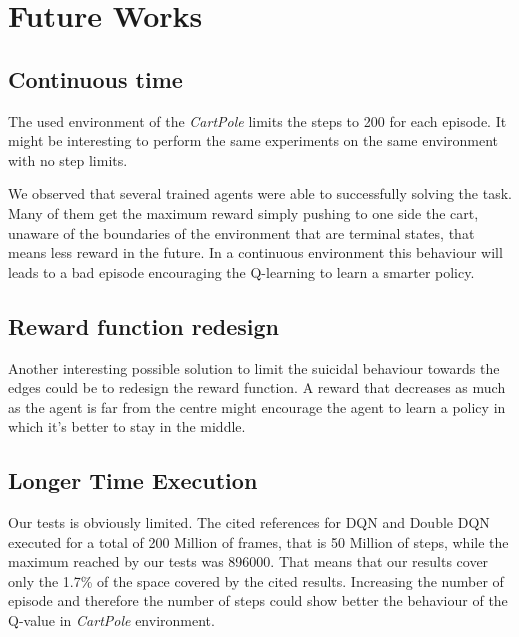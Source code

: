 
\section{Future Works}

\subsection{Continuous time}

The used environment of the \textit{CartPole} limits the steps to 200 for each episode. It might be interesting to perform the same experiments on the same environment with no step limits.

We observed that several trained agents were able to successfully solving the task. Many of them get the maximum reward simply pushing to one side the cart, unaware of the boundaries of the environment that are terminal states, that means less reward in the future. In a continuous environment this behaviour will leads to a bad episode encouraging the Q-learning to learn a smarter policy.

\subsection{Reward function redesign}

Another interesting possible solution to limit the suicidal behaviour towards the edges could be to redesign the reward function. A reward that decreases as much as the agent is far from the centre might encourage the agent to learn a policy in which it's better to stay in the middle.

\subsection{Longer Time Execution}

Our tests is obviously limited. The cited references for DQN and Double DQN executed for a total of 200 Million of frames, that is 50 Million of steps, while the maximum reached by our tests was 896000. That means that our results cover only the 1.7\% of the space covered by the cited results. Increasing the number of episode and therefore the number of steps could show better the behaviour of the Q-value in \textit{CartPole} environment.